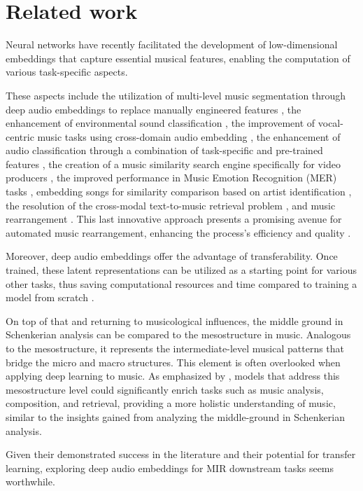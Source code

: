 \section{Related work}

Neural networks have recently facilitated the development of low-dimensional embeddings that capture essential musical features, enabling the computation of various task-specific aspects. 

These aspects include the utilization of multi-level music segmentation through deep audio embeddings to replace manually engineered features \cite{SalamonDeepSegmentation}, the enhancement of environmental sound classification \cite{Kim2020OneStrategies}, the improvement of vocal-centric music tasks using cross-domain audio embedding \cite{Kim2021LearningLoss}, the enhancement of audio classification through a combination of task-specific and pre-trained features \cite{Hung2022Feature-informedClassification}, the creation of a music similarity search engine specifically for video producers \cite{epidemic}, the improved performance in Music Emotion Recognition (MER) tasks \cite{KohComparisonRecognition}, embedding songs for similarity comparison based on artist identification \cite{contentmusicsimtriplet2020}, the resolution of the cross-modal text-to-music retrieval problem \cite{WonEmotionStories}, and music rearrangement \cite{Stoller2018IntuitiveTransitions}. This last innovative approach presents a promising avenue for automated music rearrangement, enhancing the process's efficiency and quality \cite{Plachouras2023MusicSegmentation}.

Moreover, deep audio embeddings offer the advantage of transferability. Once trained, these latent representations can be utilized as a starting point for various other tasks, thus saving computational resources and time compared to training a model from scratch \cite{HamelTransferSimilarity}.

On top of that and returning to musicological influences, the middle ground in Schenkerian analysis can be compared to the mesostructure in music. Analogous to the mesostructure, it represents the intermediate-level musical patterns that bridge the micro and macro structures. This element is often overlooked when applying deep learning to music. As emphasized by \cite{Mesostructures2023}, models that address this mesostructure level could significantly enrich tasks such as music analysis, composition, and retrieval, providing a more holistic understanding of music, similar to the insights gained from analyzing the middle-ground in Schenkerian analysis. \cite{Introduction_to_Schenkerian_Analysis}

Given their demonstrated success in the literature and their potential for transfer learning, exploring deep audio embeddings for MIR downstream tasks seems worthwhile.
